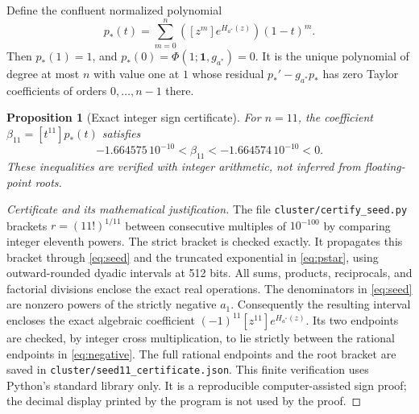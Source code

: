 \documentclass[11pt]{article}
\newtheorem{proposition}[theorem]{Proposition}
\theoremstyle{remark}\newtheorem{remark}[theorem]{Remark}
\newcommand{\coef}[2]{[#1^{#2}]}
\begin{document}
Define the confluent normalized polynomial
\begin{equation}\label{eq:pstar}
 p_*(t)=\sum_{m=0}^n\left(\coef{z}{m}e^{H_{a^*}(z)}\right)(1-t)^m.
\end{equation}
Then $p_*(1)=1$, and $p_*(0)=\Phi(1;\mathbf1,g_{a^*})=0$.
It is the unique polynomial of degree at most $n$ with value one at $1$
whose residual $p_*'-g_{a^*}p_*$ has zero Taylor coefficients of orders
$0,\ldots,n-1$ there.

\begin{proposition}[Exact integer sign certificate]\label{prop:sign}
For $n=11$, the coefficient $\beta_{11}=\coef{t}{11}p_*(t)$ satisfies
\begin{equation}\label{eq:negative}
 -1.664575\,10^{-10}<\beta_{11}<-1.664574\,10^{-10}<0.
\end{equation}
These inequalities are verified with integer arithmetic, not inferred from
floating-point roots.
\end{proposition}
\begin{proof}[Certificate and its mathematical justification]
The file \texttt{cluster/certify\_seed.py} brackets $r=(11!)^{1/11}$ between
consecutive multiples of $10^{-100}$ by comparing integer eleventh powers.
The strict bracket is checked exactly. It propagates this bracket through
\eqref{eq:seed} and the truncated exponential in \eqref{eq:pstar}, using
outward-rounded dyadic intervals at 512 bits. All sums, products, reciprocals,
and factorial divisions enclose the exact real operations. The denominators
in \eqref{eq:seed} are nonzero powers of the strictly negative $a_1$.
Consequently the resulting interval encloses the exact algebraic coefficient
$(-1)^{11}\coef{z}{11}e^{H_{a^*}(z)}$. Its two endpoints are checked, by
integer cross multiplication, to lie strictly between the rational endpoints
in \eqref{eq:negative}. The full rational endpoints and the root bracket are
saved in \texttt{cluster/seed11\_certificate.json}. This finite verification
uses Python's standard library only. It is a reproducible computer-assisted
sign proof; the decimal display printed by the program is not used by the
proof.
\end{proof}
\end{document}
